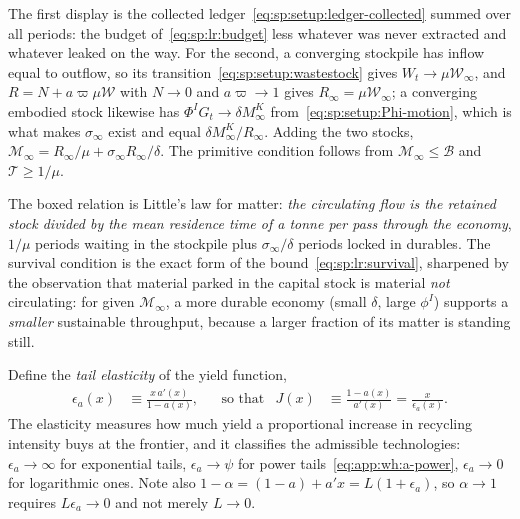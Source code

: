 The first display is the collected ledger~\eqref{eq:sp:setup:ledger-collected} summed over all periods: the budget of~\eqref{eq:sp:lr:budget} less whatever was never extracted and whatever leaked on the way. For the second, a converging stockpile has inflow equal to outflow, so its transition~\eqref{eq:sp:setup:wastestock} gives $W_t\to\mu\mathcal W_\infty$, and $R=N+a\varpi\mu\mathcal W$ with $N\to0$ and $a\varpi\to1$ gives $R_\infty=\mu\mathcal W_\infty$; a converging embodied stock likewise has $\Phi^IG_t\to\delta M^K_\infty$ from~\eqref{eq:sp:setup:Phi-motion}, which is what makes $\sigma_\infty$ exist and equal $\delta M^K_\infty/R_\infty$. Adding the two stocks, $\mathcal M_\infty=R_\infty/\mu+\sigma_\infty R_\infty/\delta$. The primitive condition follows from $\mathcal M_\infty\le\mathcal B$ and $\mathcal T\ge1/\mu$.

The boxed relation is Little's law for matter: \emph{the circulating flow is the retained stock divided by the mean residence time of a tonne per pass through the economy}, $1/\mu$ periods waiting in the stockpile plus $\sigma_\infty/\delta$ periods locked in durables. The survival condition is the exact form of the bound~\eqref{eq:sp:lr:survival}, sharpened by the observation that material parked in the capital stock is material \emph{not} circulating: for given $\mathcal M_\infty$, a more durable economy (small $\delta$, large $\phi^I$) supports a \emph{smaller} sustainable throughput, because a larger fraction of its matter is standing still.

 Define the \emph{tail elasticity} of the yield function,
\begin{align}
\epsilon_a\left(x\right) &\equiv \frac{x\,a'\left(x\right)}{1-a\left(x\right)},
&&\text{so that}
&
J\left(x\right)&\equiv\frac{1-a\left(x\right)}{a'\left(x\right)}=\frac{x}{\epsilon_a\left(x\right)} .
\label{eq:app:wh:cbgp:elasticity}
\end{align}
The elasticity measures how much yield a proportional increase in recycling intensity buys at the frontier, and it classifies the admissible technologies: $\epsilon_a\to\infty$ for exponential tails, $\epsilon_a\to\psi$ for power tails~\eqref{eq:app:wh:a-power}, $\epsilon_a\to0$ for logarithmic ones. Note also $1-\alpha=\left(1-a\right)+a'x=L\left(1+\epsilon_a\right)$, so $\alpha\to1$ requires $L\epsilon_a\to0$ and not merely $L\to0$.

